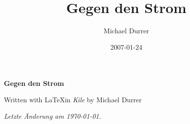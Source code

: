 \documentclass[a5paper,12pt,fleqn,titlepage,twoside]{book}
\author{Michael Durrer}
\date{2007-01-24}
\title{Gegen den Strom}
\begin{document}
\begin{titlepage}

\begin{center}

\begin{LARGE}\textbf{Gegen den Strom}\end{LARGE}
\newline
\newline
\newline
\begin{small}Written with \LaTeX in \emph{Kile} by Michael Durrer\newline\end{small}
\newline
\newline
\newline
\emph{Letzte \"Anderung am \today.}

\end{center}

\end{titlepage}
\end{document}
